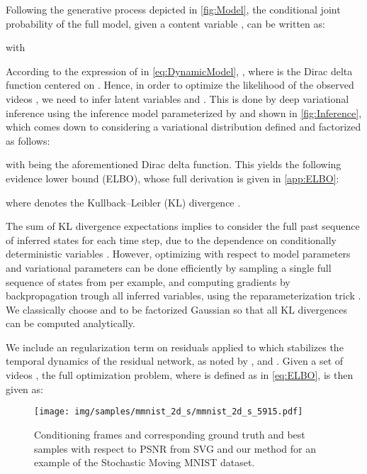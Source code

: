 \documentclass{article}
\begin{document}
Following the generative process depicted in \cref{fig:Model}, the conditional joint probability of the full model, given a content variable , can be written as:

with

According to the expression of  in \cref{eq:DynamicModel}, , where  is the Dirac delta function centered on .
Hence, in order to optimize the likelihood of the observed videos , we need to infer latent variables  and .
This is done by deep variational inference using the inference model parameterized by  and shown in \cref{fig:Inference}, which comes down to considering a variational distribution  defined and factorized as follows:

with  being the aforementioned Dirac delta function.
This yields the following evidence lower bound (ELBO), whose full derivation is given in \cref{app:ELBO}:

where  denotes the Kullback–Leibler (KL) divergence \citep{Kullback1951}.

The sum of KL divergence expectations implies to consider the full past sequence of inferred states for each time step, due to the dependence on conditionally deterministic variables .
However, optimizing  with respect to model parameters  and variational parameters  can be done efficiently by sampling a single full sequence of states from  per example, and computing gradients by backpropagation \citep{Rumelhart1988} trough all inferred variables, using the reparameterization trick \citep{Kingma2014, Rezende2014}.
We classically choose  and  to be factorized Gaussian so that all KL divergences can be computed analytically.

We include an  regularization term on residuals  applied to  which stabilizes the temporal dynamics of the residual network, as noted by \citet{Behrmann2019}, \citet{deBezenac2019} and \citet{Rousseau2019}.
Given a set of videos , the full optimization problem, where  is defined as in \cref{eq:ELBO}, is then given as:


\begin{figure*}
    \centering
    \texttt{[image: img/samples/mmnist\_2d\_s/mmnist\_2d\_s\_5915.pdf]}
    \vspace{-0.2in}
    \caption{
        \label{fig:mmnist-2d-s-sample-1}
        Conditioning frames and corresponding ground truth and best samples with respect to PSNR from SVG and our method for an example of the Stochastic Moving MNIST dataset.
    }
    \vspace{-0.13in}
\end{figure*}
 
\end{document}
